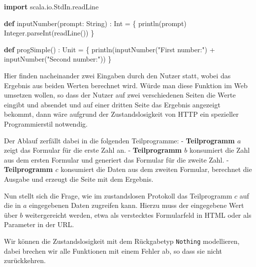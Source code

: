 \documentclass[]{article}
\newenvironment{Shaded}{}{}
\newcommand{\FunctionTok}[1]{\textcolor[rgb]{0.02,0.16,0.49}{#1}}
\newcommand{\KeywordTok}[1]{\textcolor[rgb]{0.00,0.44,0.13}{\textbf{#1}}}
\newcommand{\NormalTok}[1]{#1}
\newcommand{\StringTok}[1]{\textcolor[rgb]{0.25,0.44,0.63}{#1}}
\begin{document}
\begin{Shaded}
\begin{Highlighting}[]
\KeywordTok{import}\NormalTok{ scala.}\FunctionTok{io}\NormalTok{.}\FunctionTok{StdIn}\NormalTok{.}\FunctionTok{readLine}

\KeywordTok{def} \FunctionTok{inputNumber}\NormalTok{(prompt: String) : Int = \{}
  \FunctionTok{println}\NormalTok{(prompt)}
\NormalTok{  Integer.}\FunctionTok{parseInt}\NormalTok{(}\FunctionTok{readLine}\NormalTok{())}
\NormalTok{\}}

\KeywordTok{def} \FunctionTok{progSimple}\NormalTok{() : Unit = \{}
  \FunctionTok{println}\NormalTok{(}\FunctionTok{inputNumber}\NormalTok{(}\StringTok{"First number:"}\NormalTok{) + }\FunctionTok{inputNumber}\NormalTok{(}\StringTok{"Second number:"}\NormalTok{))}
\NormalTok{\} }
\end{Highlighting}
\end{Shaded}

Hier finden nacheinander zwei Eingaben durch den Nutzer statt, wobei das
Ergebnis aus beiden Werten berechnet wird. Würde man diese Funktion im
Web umsetzen wollen, so dass der Nutzer auf zwei verschiedenen Seiten
die Werte eingibt und absendet und auf einer dritten Seite das Ergebnis
angezeigt bekommt, dann wäre aufgrund der Zustandslosigkeit von HTTP ein
spezieller Programmierstil notwendig.

Der Ablauf zerfällt dabei in die folgenden Teilprogramme: -
\textbf{Teilprogramm \(a\)} zeigt das Formular für die erste Zahl an. -
\textbf{Teilprogramm \(b\)} konsumiert die Zahl aus dem ersten Formular
und generiert das Formular für die zweite Zahl. - \textbf{Teilprogramm
\(c\)} konsumiert die Daten aus dem zweiten Formular, berechnet die
Ausgabe und erzeugt die Seite mit dem Ergebnis.

Nun stellt sich die Frage, wie im zustandslosen Protokoll das
Teilprogramm \(c\) auf die in \(a\) eingegebenen Daten zugreifen kann.
Hierzu muss der eingegebene Wert über \(b\) weitergereicht werden, etwa
als verstecktes Formularfeld in HTML oder als Parameter in der URL.

Wir können die Zustandslosigkeit mit dem Rückgabetyp \texttt{Nothing}
modellieren, dabei brechen wir alle Funktionen mit einem Fehler ab, so
dass sie nicht zurückkehren.
\end{document}
